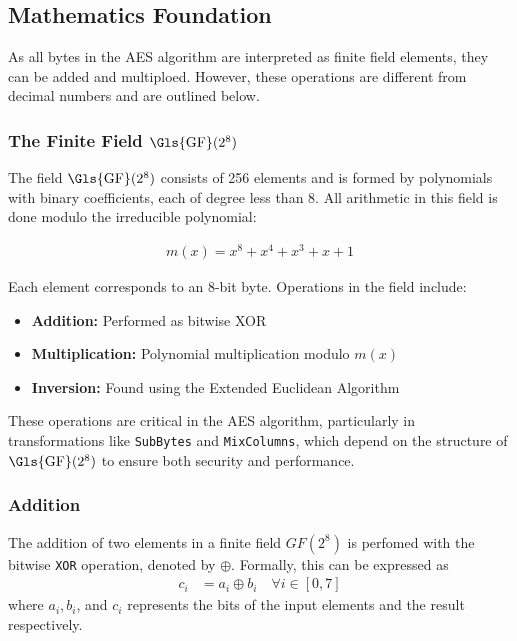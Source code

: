 \subsection{Mathematics Foundation}

As all bytes in the \gls{AES} algorithm are interpreted as finite field elements, they can be added and multiploed. 
However, these operations are different from decimal numbers and are outlined below.


\subsubsection{The Finite Field \texorpdfstring{$\mathrm{\Gls{GF}}(2^8)$}{\Gls{GF}(2^8)}}
\label{sec:galois}

The field $\mathrm{\Gls{GF}}(2^8)$ consists of 256 elements and is formed by polynomials with binary coefficients, each of degree less than 8. All arithmetic in this field is done modulo the irreducible polynomial:

\begin{align}
    m(x) = x^8 + x^4 + x^3 + x + 1 \label{eq:irred-poly}
\end{align}

Each element corresponds to an 8-bit byte. Operations in the field include:
\begin{itemize}
    \item \textbf{Addition:} Performed as bitwise XOR
    \item \textbf{Multiplication:} Polynomial multiplication modulo $m(x)$
    \item \textbf{Inversion:} Found using the Extended Euclidean Algorithm
\end{itemize}

These operations are critical in the \Gls{AES} algorithm, particularly in transformations like \texttt{SubBytes} and \texttt{MixColumns}, which depend on the structure of $\mathrm{\Gls{GF}}(2^8)$ to ensure both security and performance.

\subsubsection{Addition}
\label{sec:addition}

The addition of two elements in a finite field $GF(2^8)$ is perfomed with the bitwise \texttt{XOR} operation, denoted by $\oplus$.
Formally, this can be expressed as
\begin{align}
    c_i &= a_i \oplus b_i \quad \forall i \in [0, 7]
\end{align}
where $a_i, b_i$, and $c_i$ represents the bits of the input elements and the result respectively.


